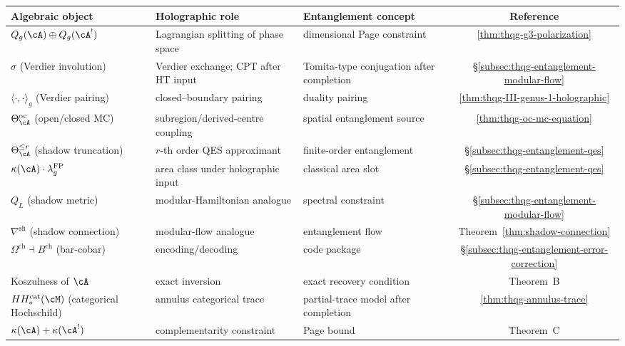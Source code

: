\begin{center}
\renewcommand{\arraystretch}{1.4}
\small
\begin{tabular}{l@{\;\;}l@{\;\;}l@{\;\;}c}
\textbf{Algebraic object} & \textbf{Holographic role}
 & \textbf{Entanglement concept} & \textbf{Reference} \\
\midrule
$Q_g(\cA) \oplus Q_g(\cA^!)$
 & Lagrangian splitting of phase space
 & dimensional Page constraint
 & \ref{thm:thqg-g3-polarization} \\
$\sigma$ (Verdier involution)
 & Verdier exchange; CPT after HT input
 & Tomita-type conjugation after completion
 & \S\ref{subsec:thqg-entanglement-modular-flow} \\
$\langle \cdot, \cdot \rangle_g$ (Verdier pairing)
 & closed--boundary pairing
 & duality pairing
 & \ref{thm:thqg-III-genus-1-holographic} \\
$\Theta^{\mathrm{oc}}_\cA$ (open/closed MC)
 & subregion/derived-centre coupling
 & spatial entanglement source
 & \ref{thm:thqg-oc-mc-equation} \\
$\Theta_\cA^{\le r}$ (shadow truncation)
 & $r$-th order QES approximant
 & finite-order entanglement
 & \S\ref{subsec:thqg-entanglement-qes} \\
$\kappa(\cA) \cdot \lambda_g^{\mathrm{FP}}$
 & area class under holographic input
 & classical area slot
 & \S\ref{subsec:thqg-entanglement-qes} \\
$Q_L$ (shadow metric)
 & modular-Hamiltonian analogue
 & spectral constraint
 & \S\ref{subsec:thqg-entanglement-modular-flow} \\
$\nabla^{\mathrm{sh}}$ (shadow connection)
 & modular-flow analogue
 & entanglement flow
 & Theorem~\ref{thm:shadow-connection} \\
$\Omega^{\mathrm{ch}}\dashv B^{\mathrm{ch}}$ (bar-cobar)
 & encoding/decoding
 & code package
 & \S\ref{subsec:thqg-entanglement-error-correction} \\
Koszulness of $\cA$
 & exact inversion
 & exact recovery condition
 & Theorem~B \\
$HH_*^{\mathrm{cat}}(\cM)$ (categorical Hochschild)
 & annulus categorical trace
 & partial-trace model after completion
 & \ref{thm:thqg-annulus-trace} \\
$\kappa(\cA)+\kappa(\cA^!)$
 & complementarity constraint
 & Page bound
 & Theorem~C
\end{tabular}
\end{center}

